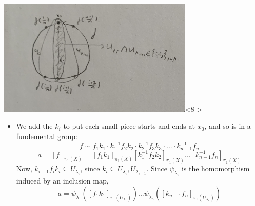 \documentclass[8pt]{beamer}
\begin{document}
\begin{frame}
\begin{columns}
\begin{column}[T]{0.5\textwidth}
        \begin{center}
          \includegraphics[width=0.7\textwidth]{img/proof-pt1.JPG}<8->
        \end{center}
        \begin{itemize}
          \item<9-> We add the $k_i$ to put each small piece starts and ends at $x_0$,
            and so is in a fundemental group:
              \[f \sim f_1k_1\cdot k_1^{-1}f_2k_2 \cdot k_2^{-1}f_3k_3 \cdot ... \cdot k_{n-1}^{-1}f_n\]
              \[a = [f]_{\pi_1(X)} = [f_1k_1]_{\pi_1(X)} [k_1^{-1}f_2k_2]_{\pi_1(X)}
                 ... [k_{n-1}^{-1}f_n]_{\pi_1(X)}\]
            Now, $k_{i-1}f_ik_i \subseteq U_{\lambda_i}$, since $k_i \subseteq
            U_{\lambda_i}, U_{\lambda_{i+1}}$. Since $\psi_{\lambda_i}$ is the
            homomorphism induced by an inclusion map,
              \[ a = \psi_{\lambda_1}([f_1k_1]_{\pi_1(U_{\lambda_1})}) ...
                \psi_{\lambda_n}( [k_{n-1}f_n]_{\pi_1(U_{\lambda_n})})\]

        \end{itemize}
      \end{column}
    \end{columns}
  \end{frame}
\end{document}
